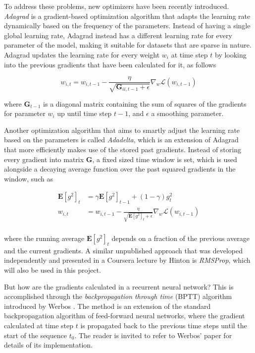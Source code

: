 \documentclass{kththesis}
\begin{document}
To address these problems, new optimizers have been recently introduced. \emph{Adagrad} \citep{duchi2011adaptive} is a gradient-based optimization algorithm that adapts the learning rate dynamically based on the frequency of the parameters. Instead of having a single global learning rate, Adagrad instead has a different learning rate for every parameter of the model, making it suitable for datasets that are sparse in nature. Adagrad updates the learning rate for every weight $w_i$ at time step $t$ by looking into the previous gradients that have been calculated for it, as follows

\begin{equation}
w_{i,t} = w_{i,t-1} - \frac{\eta}{\sqrt{\mathbf{G}_{ii, t-1} + \epsilon}} \nabla_w \mathcal{L}(w_{i,t-1})
\end{equation}

where $\mathbf{G}_{t-1}$ is a diagonal matrix containing the sum of squares of the gradients for parameter $w_i$ up until time step $t-1$, and $\epsilon$ a smoothing parameter.

Another optimization algorithm that aims to smartly adjust the learning rate based on the parameters is called \emph{Adadelta}\citep{zeiler2012adadelta}, which is an extension of Adagrad that more efficiently makes use of the stored past gradients. Instead of storing every gradient into matrix $\mathbf{G}$, a fixed sized time window is set, which is used alongside a decaying average function over the past squared gradients in the window, such as

\begin{equation}
\begin{aligned}
\mathbf{E}[g^2]_t &= \gamma \mathbf{E}[g^2]_{t-1} + (1-\gamma)g^2_t\\
w_{i,t} &= w_{i,t-1} - \frac{\eta}{\sqrt{\mathbf{E}[g^2]_t + \epsilon}} \nabla_w \mathcal{L}(w_{i,t-1}) \\
\end{aligned}
\end{equation}

where the running average $\mathbf{E}[g^2]_t$ depends on a fraction of the previous average and the current gradients. A similar unpublished approach that was developed independently and presented in a Coursera lecture by Hinton is \emph{RMSProp}\citep{hinton2012rmsprop}, which will also be used in this project. 

But how are the gradients calculated in a recurrent neural network? This is accomplished through the \emph{backpropagation through time} (BPTT) algorithm introduced by Werbos \citep{werbos1990backpropagation}. The method is an extension of the standard backpropagation algorithm of feed-forward neural networks, where the gradient calculated at time step $t$ is propagated back to the previous time steps until the start of the sequence $t_0$. The reader is invited to refer to Werbos' paper for details of its implementation.
\end{document}
